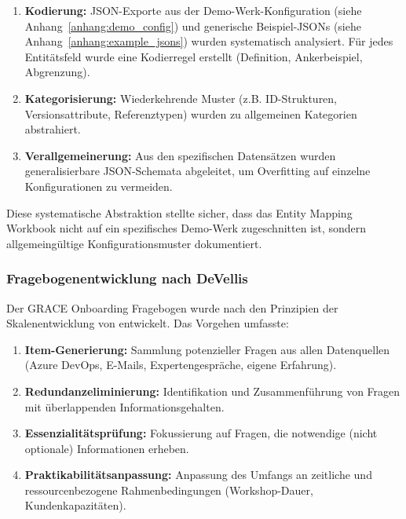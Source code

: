 \begin{enumerate}
    \item \textbf{Kodierung:} JSON-Exporte aus der Demo-Werk-Konfiguration (siehe Anhang~\ref{anhang:demo_config}) und generische Beispiel-JSONs (siehe Anhang~\ref{anhang:example_jsons}) wurden systematisch analysiert. Für jedes Entitätsfeld wurde eine Kodierregel erstellt (Definition, Ankerbeispiel, Abgrenzung).

    \item \textbf{Kategorisierung:} Wiederkehrende Muster (z.B. ID-Strukturen, Versionsattribute, Referenztypen) wurden zu allgemeinen Kategorien abstrahiert.

    \item \textbf{Verallgemeinerung:} Aus den spezifischen Datensätzen wurden generalisierbare JSON-Schemata abgeleitet, um Overfitting auf einzelne Konfigurationen zu vermeiden.
\end{enumerate}

Diese systematische Abstraktion stellte sicher, dass das Entity Mapping Workbook nicht auf ein spezifisches Demo-Werk zugeschnitten ist, sondern allgemeingültige Konfigurationsmuster dokumentiert.

\subsubsection{Fragebogenentwicklung nach DeVellis}
\label{subsubsec:Fragebogenentwicklung}

Der GRACE Onboarding Fragebogen wurde nach den Prinzipien der Skalenentwicklung von \cite{devellis:scale_development2017} entwickelt. Das Vorgehen umfasste:

\begin{enumerate}
    \item \textbf{Item-Generierung:} Sammlung potenzieller Fragen aus allen Datenquellen (Azure DevOps, E-Mails, Expertengespräche, eigene Erfahrung).

    \item \textbf{Redundanzeliminierung:} Identifikation und Zusammenführung von Fragen mit überlappenden Informationsgehalten.

    \item \textbf{Essenzialitätsprüfung:} Fokussierung auf Fragen, die notwendige (nicht optionale) Informationen erheben.

    \item \textbf{Praktikabilitätsanpassung:} Anpassung des Umfangs an zeitliche und ressourcenbezogene Rahmenbedingungen (Workshop-Dauer, Kundenkapazitäten).
\end{enumerate}

